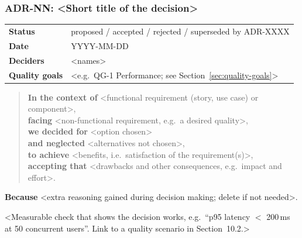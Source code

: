 \subsubsection{ADR-NN: <Short title of the decision>}
\label{adr:NN}

\begin{tabular}{@{}p{3.4cm}p{11cm}@{}}
\toprule
\textbf{Status}        & proposed / accepted / rejected / superseded by ADR-XXXX \\
\textbf{Date}          & YYYY-MM-DD \\
\textbf{Deciders}      & <names> \\
\textbf{Quality goals} & <e.g.\ QG-1 Performance; see Section~\ref{sec:quality-goals}> \\
\bottomrule
\end{tabular}

\begin{quote}
\textbf{In the context of} <functional requirement (story, use case) or component>,\\
\textbf{facing} <non-functional requirement, e.g.\ a desired quality>,\\
\textbf{we decided for} <option chosen>\\
\textbf{and neglected} <alternatives not chosen>,\\
\textbf{to achieve} <benefits, i.e.\ satisfaction of the requirement(s)>,\\
\textbf{accepting that} <drawbacks and other consequences, e.g.\ impact and effort>.
\end{quote}

\textbf{Because} <extra reasoning gained during decision making; delete if not needed>.

<Measurable check that shows the decision works, e.g.\ ``p95 latency $<$ 200\,ms at 50 concurrent users''. Link to a quality scenario in Section~10.2.>